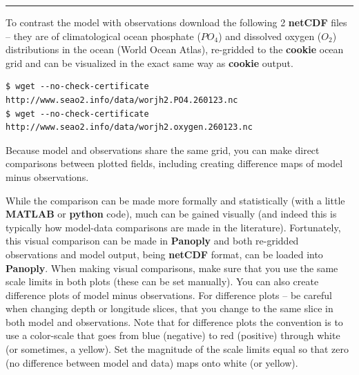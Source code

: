 \vspace{1mm} \noindent\rule{4cm}{0.5pt} \vspace{2mm}

\noindent To contrast the model with observations download the following 2 \textbf{netCDF} files -- they are of climatological ocean phosphate (\(PO_{4}\)) and dissolved oxygen (\(O_{2}\)) distributions in the ocean (World Ocean Atlas), re-gridded to the \textbf{cookie} ocean grid and can be visualized in the exact same way as \textbf{cookie} output.

\vspace{-2mm}\small\begin{verbatim}
$ wget --no-check-certificate http://www.seao2.info/data/worjh2.PO4.260123.nc
$ wget --no-check-certificate http://www.seao2.info/data/worjh2.oxygen.260123.nc
\end{verbatim}\normalsize\vspace{-2mm}

Because model and observations share the same grid, you can make direct comparisons between plotted fields, including creating difference maps of model minus observations.

\vspace{1mm}
While the comparison can be made more formally and statistically (with a little \textbf{MATLAB} or \textbf{python} code), much can be gained visually (and indeed this is typically how model-data comparisons are made in the literature). Fortunately, this visual comparison can be made in \textbf{Panoply} and both re-gridded observations and model output, being \textbf{netCDF} format, can be loaded into \textbf{Panoply}. When making visual comparisons, make sure that you use the same scale limits in both plots (these can be set manually). You can also create difference plots of model minus observations. For difference plots -- be careful when changing depth or longitude slices, that you change to the same slice in both model and observations. Note that for difference plots the convention is to use a color-scale that goes from blue (negative) to red (positive) through white (or sometimes, a yellow). Set the magnitude of the scale limits equal so that zero (no difference between model and data) maps onto white (or yellow).

\newpage

